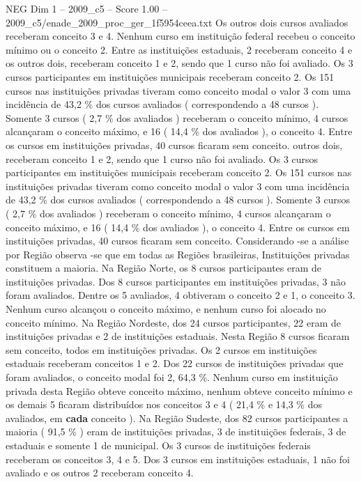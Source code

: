 \begin{textsample}{NEG Dim 1 – 2009\_c5 – Score 1.00 – 2009\_c5/enade\_2009\_proc\_ger\_1f5954ceea.txt}
Os outros dois cursos avaliados receberam conceito 3 e 4.
Nenhum curso em instituição federal recebeu o conceito mínimo ou o conceito 2.
Entre as instituições estaduais, 2 receberam conceito 4 e os outros dois, receberam conceito 1 e 2, sendo que 1 curso não foi avaliado.
Os 3 cursos participantes em instituições municipais receberam conceito 2.
Os 151 cursos nas instituições privadas tiveram como conceito modal o valor 3 com uma incidência de 43,2 \% dos cursos avaliados ( correspondendo a 48 cursos ).
Somente 3 cursos ( 2,7 \% dos avaliados ) receberam o conceito mínimo, 4 cursos alcançaram o conceito máximo, e 16 ( 14,4 \% dos avaliados ), o conceito 4.
Entre os cursos em instituições privadas, 40 cursos ficaram sem conceito. outros dois, receberam conceito 1 e 2, sendo que 1 curso não foi avaliado.
Os 3 cursos participantes em instituições municipais receberam conceito 2.
Os 151 cursos nas instituições privadas tiveram como conceito modal o valor 3 com uma incidência de 43,2 \% dos cursos avaliados ( correspondendo a 48 cursos ).
Somente 3 cursos ( 2,7 \% dos avaliados ) receberam o conceito mínimo, 4 cursos alcançaram o conceito máximo, e 16 ( 14,4 \% dos avaliados ), o conceito 4.
Entre os cursos em instituições privadas, 40 cursos ficaram sem conceito.
Considerando -se a análise por Região observa -se que em todas as Regiões brasileiras, Instituições privadas constituem a maioria.
Na Região Norte, os 8 cursos participantes eram de instituições privadas.
Dos 8 cursos participantes em instituições privadas, 3 não foram avaliados.
Dentre os 5 avaliados, 4 obtiveram o conceito 2 e 1, o conceito 3.
Nenhum curso alcançou o conceito máximo, e nenhum curso foi alocado no conceito mínimo.
Na Região Nordeste, dos 24 cursos participantes, 22 eram de instituições privadas e 2 de instituições estaduais.
Nesta Região 8 cursos ficaram sem conceito, todos em instituições privadas.
Os 2 cursos em instituições estaduais receberam conceitos 1 e 2.
Dos 22 cursos de instituições privadas que foram avaliados, o conceito modal foi 2, 64,3 \%.
Nenhum curso em instituição privada desta Região obteve conceito máximo, nenhum obteve conceito mínimo e os demais 5 ficaram distribuídos nos conceitos 3 e 4 ( 21,4 \% e 14,3 \% dos avaliados, em \textbf{cada} conceito ).
Na Região Sudeste, dos 82 cursos participantes a maioria ( 91,5 \% ) eram de instituições privadas, 3 de instituições federais, 3 de estaduais e somente 1 de municipal.
Os 3 cursos de instituições federais receberam os conceitos 3, 4 e 5.
Dos 3 cursos em instituições estaduais, 1 não foi avaliado e os outros 2 receberam conceito 4.

\end{textsample}
